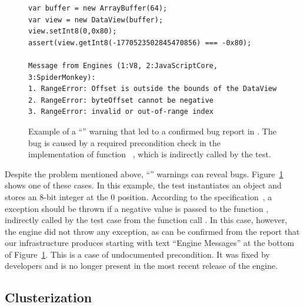 \documentclass[smallextended]{svjour3}
\begin{document}
\begin{figure}[h!]
  \centering
  \begin{lstlisting}
var buffer = new ArrayBuffer(64);
var view = new DataView(buffer);
view.setInt8(0,0x80);
assert(view.getInt8(-1770523502845470856) === -0x80);

Message from Engines (1:V8, 2:JavaScriptCore, 3:SpiderMonkey):
1. RangeError: Offset is outside the bounds of the DataView
2. RangeError: byteOffset cannot be negative
3. RangeError: invalid or out-of-range index
  \end{lstlisting}
  \caption{\label{fig:lo-truepositive}Example of a ``\lo'' warning
    that led to a confirmed bug report in \chakra. The bug is caused
    by a required precondition check in the implementation of function
    ~\cite{ecmas262-getviewvalue}, which is indirectly called by the test. }
\end{figure}

Despite the problem mentioned above, ``\lo'' warnings can reveal bugs.
Figure~\ref{fig:lo-truepositive} shows one of these cases. In this
example, the test instantiates an  object and
stores an 8-bit integer at the 0 position. According to the
specification~\cite{ecmas262-getviewvalue}, a 
exception should be thrown if a negative value is passed to the
function , indirectly called by the test case from the
function call . In this case, however, the \chakra{}
engine did not throw any exception, as can be confirmed from the
report that our infrastructure produces starting with text ``Engine
Messages'' at the bottom of Figure~\ref{fig:lo-truepositive}. This is
a case of undocumented precondition. It was fixed by developers and is
no longer present in the most recent release of the engine.

\subsection{Clusterization}
\label{sec:clusterization}

\end{document}
